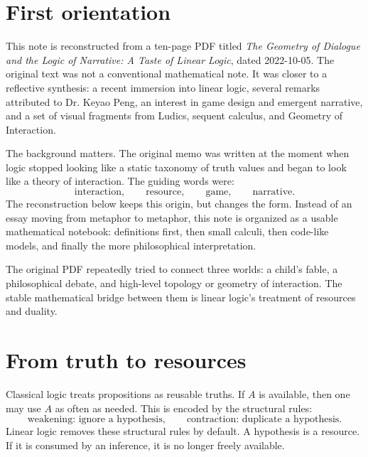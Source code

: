 
\section{First orientation}

This note is reconstructed from a ten-page PDF titled \emph{The Geometry of Dialogue and the Logic of Narrative: A Taste of Linear Logic}, dated 2022-10-05.  The original text was not a conventional mathematical note.  It was closer to a reflective synthesis: a recent immersion into linear logic, several remarks attributed to Dr. Keyao Peng, an interest in game design and emergent narrative, and a set of visual fragments from Ludics, sequent calculus, and Geometry of Interaction.

The background matters.  The original memo was written at the moment when logic stopped looking like a static taxonomy of truth values and began to look like a theory of interaction.  The guiding words were:
\[
  \text{interaction},\qquad \text{resource},\qquad \text{game},\qquad \text{narrative}.
\]
The reconstruction below keeps this origin, but changes the form.  Instead of an essay moving from metaphor to metaphor, this note is organized as a usable mathematical notebook: definitions first, then small calculi, then code-like models, and finally the more philosophical interpretation.

\begin{remark}
The original PDF repeatedly tried to connect three worlds: a child's fable, a philosophical debate, and high-level topology or geometry of interaction.  The stable mathematical bridge between them is linear logic's treatment of resources and duality.
\end{remark}

\section{From truth to resources}

Classical logic treats propositions as reusable truths.  If \(A\) is available, then one may use \(A\) as often as needed.  This is encoded by the structural rules:
\[
  \text{weakening: ignore a hypothesis},\qquad
  \text{contraction: duplicate a hypothesis}.
\]
Linear logic removes these structural rules by default.  A hypothesis is a resource.  If it is consumed by an inference, it is no longer freely available.

